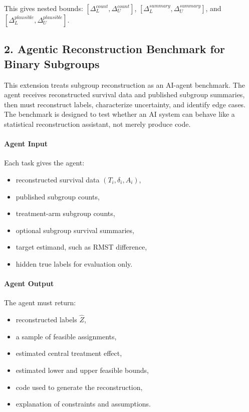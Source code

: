 \documentclass[11pt]{article}
\begin{document}
This gives nested bounds: \([\Delta_L^{count},\Delta_U^{count}]\), \([\Delta_L^{summary},\Delta_U^{summary}]\), and \([\Delta_L^{plausible},\Delta_U^{plausible}]\).

\subsection*{2. Agentic Reconstruction Benchmark for Binary Subgroups}

This extension treats subgroup reconstruction as an AI-agent benchmark. The agent receives reconstructed survival data and published subgroup summaries, then must reconstruct labels, characterize uncertainty, and identify edge cases.
The benchmark is designed to test whether an AI system can behave like a statistical reconstruction assistant, not merely produce code.

\paragraph*{Agent Input}

Each task gives the agent:

\begin{itemize}
\item reconstructed survival data \((T_i,\delta_i,A_i)\),
\item published subgroup counts,
\item treatment-arm subgroup counts,
\item optional subgroup survival summaries,
\item target estimand, such as RMST difference,
\item hidden true labels for evaluation only.
\end{itemize}

\paragraph*{Agent Output}

The agent must return:

\begin{itemize}
\item reconstructed labels \(\hat Z\),
\item a sample of feasible assignments,
\item estimated central treatment effect,
\item estimated lower and upper feasible bounds,
\item code used to generate the reconstruction,
\item explanation of constraints and assumptions.
\end{itemize}
\end{document}

